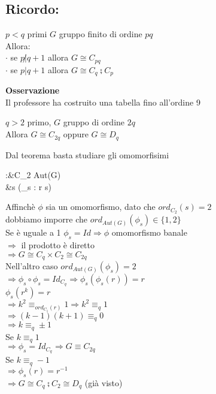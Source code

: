 \documentclass[12px]{article}
\begin{document}
	\subsection{Ricordo:}
	\begin{teo}
		$p < q$ primi $G$ gruppo finito di ordine $pq$\\
		Allora:\\
		$\cdot$ se $p\not  | q + 1$ allora $G\cong C_{pq}$\\
		 $\cdot$ se $p | q + 1$ allora $ G\cong C_q\semi C_p$
	\end{teo}
	\textbf{Osservazione}\\
	Il professore ha costruito una tabella fino all'ordine 9\\
	\begin{coro}
		$q > 2$ primo, $G$ gruppo di ordine $2q$\\
		Allora $G\cong C_{2q}$ oppure $G\cong D_q$
	\end{coro}
	\begin{dimo}
		Dal teorema basta studiare gli omomorfisimi
		\begin{center}
		\begin{aligned}
			\phi:&C_2 \rightarrow Aut(G)\\
			     &s \rightarrow (\phi_s : r \rightarrow s)
			
		\end{aligned}
		\end{center}
		Affinchè $\phi$ sia un omomorfismo, dato che $ord_{C_2}(s) = 2$\\
		dobbiamo imporre che $ord_{Aut(G)}(\phi_s) \in \{1,2\}$\\
		Se è uguale a 1 $\phi_s = Id \Rightarrow \phi$ omomorfismo banale\\
		$ \Rightarrow $ il prodotto è diretto\\
		$ \Rightarrow G\cong C_q\times C_2\cong C_{2q}$ \\
		Nell'altro caso $ord_{Aut(G)}(\phi_s) = 2$\\
		$ \Rightarrow \phi_s\circ\phi_s = Id_{C_q} \Rightarrow \phi_s(\phi_s(r))=r$ \\
		$\phi_s(r^k) = r$\\
		$ \Rightarrow k^2\equiv_{ord_{C_1}(r)} 1 \Rightarrow k^2\equiv_q 1$ \\
		$ \Rightarrow (k-1)(k+1)\equiv_q 0$ \\
		$ \Rightarrow k\equiv_q \pm 1$ \\
		Se $k \equiv_q 1$\\
		$ \Rightarrow \phi_s = Id_{C_q} \Rightarrow G\equiv C_{2q}$ \\
		Se $k\equiv_q -1$\\
		$ \Rightarrow \phi_s(r) = r^{-1}$\\
		$ \Rightarrow G\cong C_q\semi C_2\cong D_q$ (già visto)

	\end{dimo}
\end{document}
